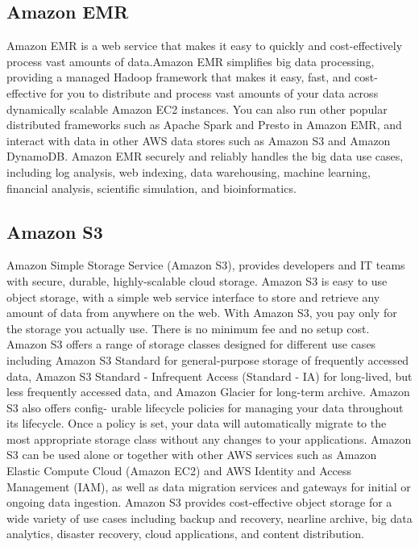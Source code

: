 \subsection{Amazon EMR}
Amazon EMR is a web service that makes it easy to quickly and cost-effectively process vast amounts of data.Amazon EMR simplifies big data processing, providing a managed Hadoop framework that makes it easy, fast, and cost-effective for you to distribute and process vast amounts of your data across dynamically scalable Amazon EC2 instances. You can also run other popular distributed frameworks such as Apache Spark and Presto in Amazon EMR, and interact with data in other AWS data stores such as Amazon S3 and Amazon DynamoDB. Amazon EMR securely and reliably handles the big data use cases, including log analysis, web indexing, data warehousing, machine learning, financial analysis, scientific simulation, and bioinformatics.  \cite{ams2016emr}

\subsection{Amazon S3}

Amazon Simple Storage Service (Amazon S3), provides developers and IT teams with secure, durable, highly-scalable cloud storage. Amazon S3 is easy to use object storage, with a simple web service interface to store and retrieve any amount of data from anywhere on the web. With Amazon S3, you pay only for the storage you actually use. There is no minimum fee and no setup cost. Amazon S3 offers a range of storage classes designed for different use cases including Amazon S3 Standard for general-purpose storage of frequently accessed data, Amazon S3 Standard - Infrequent Access (Standard - IA) for long-lived, but less frequently accessed data, and Amazon Glacier for long-term archive. Amazon S3 also offers config- urable lifecycle policies for managing your data throughout its lifecycle. Once a policy is set, your data will automatically migrate to the most appropriate storage class without any changes to your applications. Amazon S3 can be used alone or together with other AWS services such as Amazon Elastic Compute Cloud (Amazon EC2) and AWS Identity and Access Management (IAM), as well as data migration services and gateways for initial or ongoing data ingestion. Amazon S3 provides cost-effective object storage for a wide variety of use cases including backup and recovery, nearline archive, big data analytics, disaster recovery, cloud applications, and content distribution.  \cite{aws2016S3}










  

